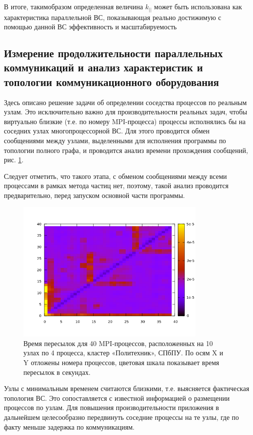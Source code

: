 		В итоге, такимобразом определенная  величина $k_{||} $ может быть использована как характеристика параллельной ВС, показывающая реально достижимую с помощью данной ВС эффективность и масштабируемость   
		
		\subsection{Измерение продолжительности параллельных коммуникаций и анализ характеристик и топологии коммуникационного оборудования}
		Здесь описано решение задачи об определении соседства процессов по реальным узлам. Это исключительно важно для производительности реальных задач, чтобы виртуально близкие (т.е. по номеру MPI-процесса) процессы исполнялись бы на соседних узлах многопроцессорной ВС. Для этого проводится обмен сообщениями между узлами, выделенными 
		для исполнения программы по топологии полного графа, и проводится анализ времени прохождения сообщений, рис. \ref{poly_all2all}.  
		
		Следует отметить, что такого этапа, с обменом сообщениями между всеми процессами в рамках метода частиц нет, поэтому, такой анализ проводится предварительно, перед запуском основной части программы.

		
		\begin{figure}[htb]
			\begin{center}
				\includegraphics[height=7cm,keepaspectratio]{images/polytech_all_to_all.png}
			\end{center}
			\caption{Время пересылок для 40 MPI-процессов, расположенных на 10 узлах по 4 процесса, кластер «Политехник», СПбПУ. По осям X и Y отложены номера процессов, цветовая шкала показывает время пересылок в секундах.}
			\label{poly_all2all}
		\end{figure} 
		Узлы с минимальным временем считаются близкими, т.е. выясняется фактическая топология ВС. Это сопоставляется с известной информацией о размещении процессов по узлам.	Для повышения производительности приложения в дальнейшем целесообразно передвинуть соседние процессы на те узлы, где по факту меньше задержка по коммуникациям.
		
